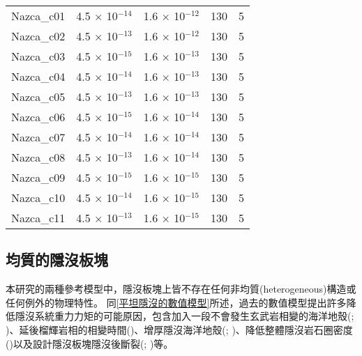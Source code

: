 \begin{table}[htp]
\begin{tabular}{|lllll|}
        Nazca\_c01 & 4.5 $\times$ 10$^{-14}$ & 1.6 $\times$ 10$^{-12}$ & 130       & 5            \\
        Nazca\_c02 & 4.5 $\times$ 10$^{-13}$ & 1.6 $\times$ 10$^{-12}$ & 130       & 5            \\
        Nazca\_c03 & 4.5 $\times$ 10$^{-15}$ & 1.6 $\times$ 10$^{-13}$ & 130       & 5            \\
        Nazca\_c04 & 4.5 $\times$ 10$^{-14}$ & 1.6 $\times$ 10$^{-13}$ & 130       & 5            \\
        Nazca\_c05 & 4.5 $\times$ 10$^{-13}$ & 1.6 $\times$ 10$^{-13}$ & 130       & 5            \\
        Nazca\_c06 & 4.5 $\times$ 10$^{-15}$ & 1.6 $\times$ 10$^{-14}$ & 130       & 5            \\
        Nazca\_c07 & 4.5 $\times$ 10$^{-14}$ & 1.6 $\times$ 10$^{-14}$ & 130       & 5            \\
        Nazca\_c08 & 4.5 $\times$ 10$^{-13}$ & 1.6 $\times$ 10$^{-14}$ & 130       & 5            \\
        Nazca\_c09 & 4.5 $\times$ 10$^{-15}$ & 1.6 $\times$ 10$^{-15}$ & 130       & 5            \\
        Nazca\_c10 & 4.5 $\times$ 10$^{-14}$ & 1.6 $\times$ 10$^{-15}$ & 130       & 5            \\
        Nazca\_c11 & 4.5 $\times$ 10$^{-13}$ & 1.6 $\times$ 10$^{-15}$ & 130       & 5            \\ \hline
    \end{tabular}
\end{table}

\subsection{均質的隱沒板塊}
本研究的兩種參考模型中，隱沒板塊上皆不存在任何非均質(heterogeneous)構造或任何例外的物理特性。
同\ref{平坦隱沒的數值模型}所述，過去的數值模型提出許多降低隱沒系統重力力矩的可能原因，包含加入一段不會發生玄武岩相變的海洋地殼(\citealp{Liu2016}; \citealp{Gerya2009})、延後榴輝岩相的相變時間(\citealp{van2002role})、增厚隱沒海洋地殼(\citealp{Liu2016}; \citealp{axen2018basal})、降低整體隱沒岩石圈密度(\citealp{Gerya2009})以及設計隱沒板塊隱沒後斷裂(\citealp{Liu2016}; \citealp{axen2018basal})等。

